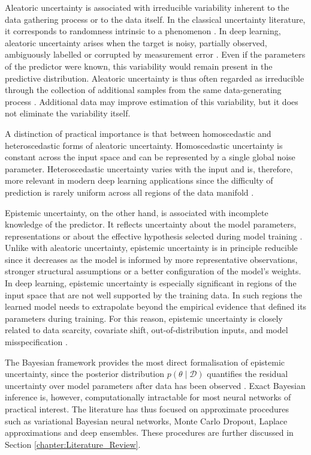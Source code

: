 Aleatoric uncertainty is associated with irreducible variability inherent to the data gathering process or to the data itself. In the classical uncertainty literature, it corresponds to randomness intrinsic to a phenomenon \cite{derkiureghian2009aleatory}. In deep learning, aleatoric uncertainty arises when the target is noisy, partially observed, ambiguously labelled or corrupted by measurement error \cite{kendall2017uncertainties}. Even if the parameters of the predictor were known, this variability would remain present in the predictive distribution. Aleatoric uncertainty is thus often regarded as irreducible through the collection of additional samples from the same data-generating process \cite{kendall2017uncertainties}. Additional data may improve estimation of this variability, but it does not eliminate the variability itself.

A distinction of practical importance is that between homoscedastic and heteroscedastic forms of aleatoric uncertainty. Homoscedastic uncertainty is constant across the input space and can be represented by a single global noise parameter. Heteroscedastic uncertainty varies with the input and is, therefore, more relevant in modern deep learning applications since the difficulty of prediction is rarely uniform across all regions of the data manifold \cite{kendall2017uncertainties}.

Epistemic uncertainty, on the other hand, is associated with incomplete knowledge of the predictor. It reflects uncertainty about the model parameters, representations or about the effective hypothesis selected during model training \cite{derkiureghian2009aleatory,kendall2017uncertainties}. Unlike with aleatoric uncertainty, epistemic uncertainty is in principle reducible since it decreases as the model is informed by more representative observations, stronger structural assumptions or a better configuration of the model's weights. In deep learning, epistemic uncertainty is especially significant in regions of the input space that are not well supported by the training data. In such regions the learned model needs to extrapolate beyond the empirical evidence that defined its parameters during training. For this reason, epistemic uncertainty is closely related to data scarcity, covariate shift, out-of-distribution inputs, and model misspecification \cite{mena2021survey,jang2023survey}.

The Bayesian framework provides the most direct formalisation of epistemic uncertainty, since the posterior distribution \(p(\theta \mid \mathcal{D})\) quantifies the residual uncertainty over model parameters after data has been observed \cite{jang2023survey}. Exact Bayesian inference is, however, computationally intractable for most neural networks of practical interest. The literature has thus focused on approximate procedures such as variational Bayesian neural networks, Monte Carlo Dropout, Laplace approximations and deep ensembles. These procedures are further discussed in Section \ref{chapter:Literature_Review}.

